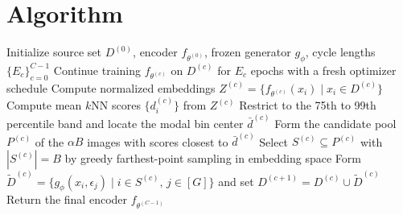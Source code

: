 \documentclass{article}
\newcommand{\method}{BRIDGE}
\begin{document}
\section{Algorithm}
\begin{algorithm}[H]
\caption{\method\ training loop with mode-window selection}
\label{alg:bridge}
\begin{algorithmic}[1]
\STATE Initialize source set $D^{(0)}$, encoder $f_{\theta^{(0)}}$, frozen generator $g_{\phi}$, cycle lengths $\{E_c\}_{c=0}^{C-1}$
    \STATE Continue training $f_{\theta^{(c)}}$ on $D^{(c)}$ for $E_c$ epochs with a fresh optimizer schedule
        \STATE Compute normalized embeddings $Z^{(c)} = \{f_{\theta^{(c)}}(x_i) \mid x_i \in D^{(c)}\}$
        \STATE Compute mean $k$NN scores $\{d_i^{(c)}\}$ from $Z^{(c)}$
        \STATE Restrict to the 75th to 99th percentile band and locate the modal bin center $\bar d^{(c)}$
        \STATE Form the candidate pool $P^{(c)}$ of the $\alpha B$ images with scores closest to $\bar d^{(c)}$
        \STATE Select $S^{(c)} \subseteq P^{(c)}$ with $|S^{(c)}| = B$ by greedy farthest-point sampling in embedding space
        \STATE Form $\widetilde{D}^{(c)} = \{g_{\phi}(x_i, \epsilon_j) \mid i \in S^{(c)},\, j \in [G]\}$ and set $D^{(c+1)} = D^{(c)} \cup \widetilde{D}^{(c)}$
    \ENDIF
\ENDFOR
\STATE Return the final encoder $f_{\theta^{(C-1)}}$
\end{algorithmic}
\end{algorithm}

\FloatBarrier
\end{document}
